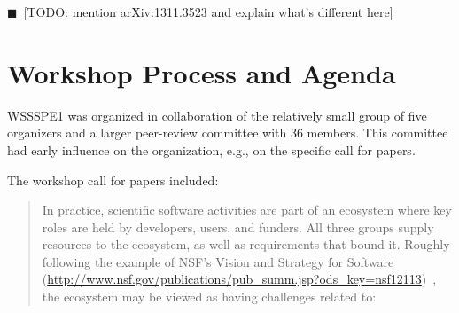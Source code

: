\documentclass[11pt, oneside]{amsart}
\newcommand{\todo}[1]{{\color{blue}$\blacksquare$~\textsf{[TODO: #1]}}}
\begin{document}
\todo{mention arXiv:1311.3523 and explain what's different here}

\section{Workshop Process and Agenda}

WSSSPE1 was organized in collaboration of the relatively small group of five organizers and
a larger peer-review committee with 36 members. This committee had early influence on the organization,
e.g., on the specific call for papers.

The workshop call for papers included:

\begin{quote}
In practice, scientific software activities are part of an ecosystem where key roles are held by 
developers, users, and funders. All three groups supply resources to the ecosystem, as well as 
requirements that bound it. Roughly following the example of NSF's Vision and Strategy for Software 
(\url{http://www.nsf.gov/publications/pub_summ.jsp?ods_key=nsf12113})~\cite{NSF_software_vision}, 
the ecosystem may be viewed as having challenges related to:


\end{quote}
\end{document}
